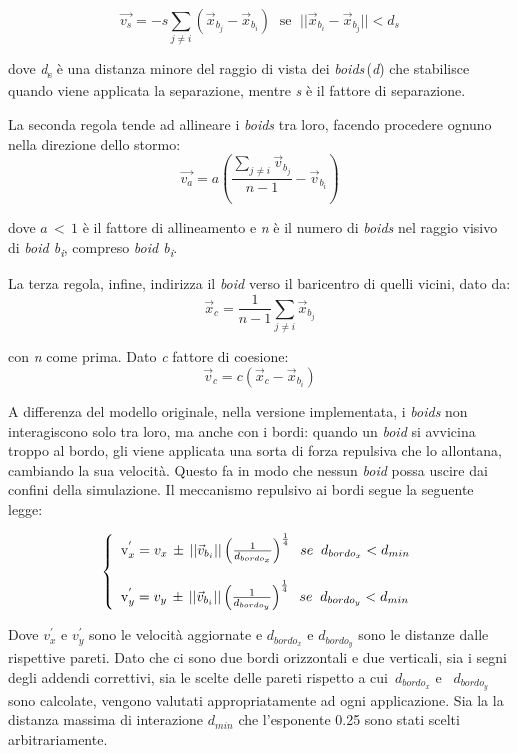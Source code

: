 \documentclass{article}
\begin{document}
\smallskip
\[
\vec{v_s} = -s \sum_{j \neq i} (\vec{x}_{b_j} - \vec{x}_{b_i}) \; \text{ se } \;
 ||\vec{x}_{b_i} - \vec{x}_{b_j}|| < d_s 
\]

\smallskip

dove \textit{d}\textsubscript{s} è una distanza minore del raggio di vista dei 
\textit{boids}\,(\textit{d}) che stabilisce quando viene applicata la 
separazione, mentre \textit{s} è il fattore di separazione.

La seconda regola tende ad allineare i \textit{boids} tra loro, facendo 
procedere ognuno nella direzione dello stormo:\medskip
\[
\vec{v_a} = a\left(\frac{\sum_{j \neq i} \vec{v}_{b_j}}{n - 1}  - \vec{v}_{b_i}\right)
\]

\medskip

dove $\textit{a}\,<\,1$ è il fattore di allineamento e \textit{n} è il numero di
 \textit{boids} nel raggio visivo di \textit{boid b\textsubscript{i}}, compreso 
 \textit{boid b\textsubscript{i}}. 

La terza regola, infine, indirizza il \textit{boid} verso il baricentro di 
quelli vicini, dato da:\smallskip
\[
{\vec{x}}_c = \frac{1}{n - 1} \sum_{j \neq i}  \vec{x}_{b_j}
\]

con \textit{n} come prima. Dato \textit{c} fattore di coesione:
\[
\vec{v}_c = c \left( \vec{x}_c - \vec{x}_{b_i} \right)
\]

\medskip
A differenza del modello originale, nella versione implementata, i 
\textit{boids} non interagiscono solo tra loro, ma anche con i bordi: quando un 
\textit{boid} si avvicina troppo al bordo, gli viene applicata una sorta di forza 
repulsiva che lo allontana, cambiando la sua velocità. Questo fa in modo che 
nessun \textit{boid} possa uscire dai confini della simulazione. Il meccanismo
 repulsivo ai bordi segue la seguente legge:

\label{repulsive}\[
 \left\{
 \begin{array}{l}
      \text v_x^{'}= v_x \,\pm \,|| \vec{v}_{b_i} || \left(\frac{1}
      {d_{bordo_{x}}}\right)^{\frac{1}{4}} \;\;se\;\; d_{bordo_{x}} < d_{min} \\
       \\
      \text v_y^{'} = v_y\, \pm \, || \vec{v}_{b_i} || \left(\frac{1}
      {d_{bordo_{y}}}\right)^{\frac{1}{4}} \;\;se\;\; d_{bordo_{y}} < d_{min}
       
 \end{array} \right.
\]

\medskip
Dove $v_x^{'}$ e $v_y^{'}$ sono le velocità aggiornate e $d_{bordo_x}$ e 
$d_{bordo_y}$ sono le distanze dalle rispettive pareti. Dato che ci sono due 
bordi orizzontali e due verticali, sia i segni degli addendi correttivi, sia le 
scelte delle pareti rispetto a cui \,$d_{bordo_x}$ e \, $d_{bordo_y}$ sono
 calcolate, vengono valutati appropriatamente ad ogni applicazione. 
 Sia la la distanza massima di interazione $d_{min}$ che l'esponente 0.25 sono 
 stati scelti arbitrariamente.
\end{document}
